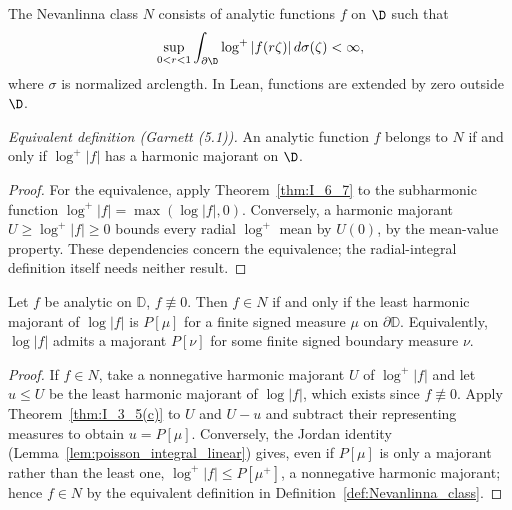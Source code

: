 \begin{definition}
  \label{def:Nevanlinna_class}
  \leanok
  The Nevanlinna class $N$ consists of analytic functions $f$ on $\D$ such that
  \[
    \sup_{0<r<1}\int_{\partial\D}\log^+|f(r\zeta)|\,d\sigma(\zeta)<\infty,
  \]
  where $\sigma$ is normalized arclength. In Lean, functions are extended by
  zero outside $\D$.

  \emph{Equivalent definition (Garnett (5.1)).} An analytic function $f$ belongs
  to $N$ if and only if $\log^+|f|$ has a harmonic majorant on $\D$.
  \begin{proof}
    \leanok
    For the equivalence, apply Theorem~\ref{thm:I_6_7} to the subharmonic
    function $\log^+|f|=\max(\log|f|,0)$. Conversely, a harmonic majorant
    $U\ge\log^+|f|\ge0$ bounds every radial $\log^+$ mean by $U(0)$, by the
    mean-value property. These dependencies concern the equivalence; the
    radial-integral definition itself needs neither result.
  \end{proof}
\end{definition}

\begin{theorem}
  \label{thm:II_5_1}
  \leanok
  \mainline
  Let $f$ be analytic on $\mathbb{D}$, $f\not\equiv0$. Then $f\in N$ if and
  only if the least harmonic majorant of $\log|f|$ is $P[\mu]$ for a finite
  signed measure $\mu$ on $\partial\mathbb{D}$. Equivalently, $\log|f|$
  admits a majorant $P[\nu]$ for some finite signed boundary measure $\nu$.
  \begin{proof}
    \leanok
    If $f\in N$, take a nonnegative harmonic majorant $U$ of $\log^+|f|$
    and let $u\le U$ be the least harmonic majorant of $\log|f|$, which
    exists since $f\not\equiv0$. Apply Theorem~\ref{thm:I_3_5(c)} to $U$ and
    $U-u$ and subtract their representing measures to obtain $u=P[\mu]$.
    Conversely, the Jordan identity
    (Lemma~\ref{lem:poisson_integral_linear}) gives, even if $P[\mu]$
    is only a majorant rather than the least one,
    $\log^+|f|\le P[\mu^+]$, a nonnegative harmonic majorant; hence $f\in N$
    by the equivalent definition in Definition~\ref{def:Nevanlinna_class}.
  \end{proof}
\end{theorem}

